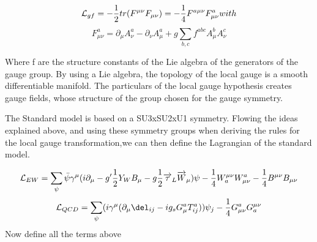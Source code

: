 \begin{equation*}
    \mathcal{L}_{gf} = -\frac{1}{2}tr(F^{\mu \nu} F_{\mu \nu}) = -\frac{1}{4}F^{a \mu \nu}F_{\mu \nu}^a with
\end{equation*}
\begin{equation*}
    F_{\mu \nu}^a = \partial_{\mu}A_{\nu}^a - \partial_{\nu}A_{\mu}^a + g \sum_{b,c} f^{abc}A_{\mu}^b A_{\nu}^c
\end{equation*}

Where f are the structure constants of the Lie algebra of the generators of the gauge group.  By using a Lie algebra, the topology of the local gauge is a smooth differentiable manifold. The particulars of the local gauge hypothesis creates gauge fields, whose structure of the group chosen for the gauge symmetry. 



The Standard model is based on a SU3xSU2xU1 symmetry. Flowing the ideas explained above, and using these symmetry groups when deriving the rules for the local gauge transformation,we can then define the Lagrangian of the standard model. 

\begin{equation*}
    \mathcal{L}_{EW} = \sum_{\psi}\bar{\psi}\gamma^{\mu}(i\partial_{\mu} - g'\frac{1}{2}Y_W B_{\mu} - g\frac{1}{2}\overrightarrow{\tau}_L \overrightarrow{W}_{\mu})\psi - \frac{1}{4}W_a^{\mu \nu} W_{\mu \nu}^a -\frac{1}{4}B^{\mu \nu}B_{\mu \nu}
\end{equation*}
\begin{equation*}
    \Lagr_{QCD} = \sum_{\psi}(i\gamma^{\mu}(\partial_{\mu}\del_{ij}-ig_s G_{\mu}^a T_{ij}^a))\psi_j - \frac{1}{4}G_{\mu \nu}^a G_a^{\mu \nu}
\end{equation*}
Now define all the terms above

